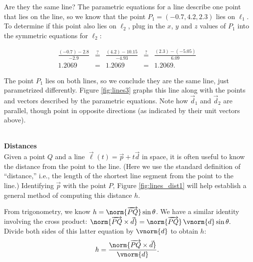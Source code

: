 {Are they the same line? The parametric equations for a line describe one point that lies on the line, so we know that the point $P_1 = (-0.7,4.2,2.3)$ lies on $\ell_1$. To determine if this point also lies on $\ell_2$, plug in the $x$, $y$ and $z$ values of $P_1$ into the symmetric equations for $\ell_2$:

\[
\begin{array}{ccccc}
\frac{(-0.7)-2.8}{-2.9} &\stackrel{?}{=}& \frac{(4.2)-10.15}{-4.93} &\stackrel{?}{=}& \frac{(2.3)-(-5.05)}{6.09}\\
 1.2069 &=& 1.2069 &=& 1.2069.
\end{array}
\]

The point $P_1$ lies on both lines, so we conclude they are the same line, just parametrized differently. Figure \ref{fig:lines3} graphs this line along with the points and vectors described by the parametric equations. Note how $\vec d_1$ and $\vec d_2$ are parallel, though point in opposite directions (as indicated by their unit vectors above). 
}\\

\noindent\textbf{\large Distances}\\

Given a point $Q$ and a line $\vec\ell(t) = \vec p+t\vec d$ in space, it is often useful to know the distance from the point to the line. (Here we use the standard definition of ``distance,'' i.e., the length of the shortest line segment from the point to the line.) Identifying $\vec p$ with the point $P$, Figure \ref{fig:lines_dist1} will help establish a general method of computing this distance $h$.


From trigonometry, we know $h = \norm{\overrightarrow{PQ}}\sin\theta$. We have a similar identity involving the cross product: $\norm{\overrightarrow{PQ}\times \vec d} = \norm{\overrightarrow{PQ}}\, \vnorm{d}\sin\theta.$ Divide both sides of this latter equation by $\vnorm{d}$ to obtain $h$:
\begin{equation}
h = \frac{\norm{\overrightarrow{PQ}\times \vec d}}{\vnorm{d}}.
\label{eq:lines2}
\end{equation}

